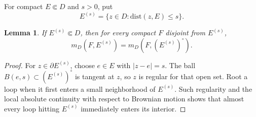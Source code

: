 \documentclass[11pt]{article}
\numberwithin{equation}{section}
\newcommand{\1}{\mathbf{1}}
\newcommand{\dist}{\mathrm{dist}}
\newtheorem{lemma}[theorem]{Lemma}
\begin{document}
For compact \(E\Subset D\) and \(s>0\), put
\[
 E^{(s)}=\{z\in D:\dist(z,E)\leq s\}.
\]
\begin{lemma}\label{lem:parallel-regular}
If \(E^{(s)}\Subset D\), then for every compact \(F\) disjoint from
\(E^{(s)}\),
\[
 m_D(F,E^{(s)})=m_D(F,(E^{(s)})^\circ).
\]
\end{lemma}
\begin{proof}
For \(z\in\partial E^{(s)}\), choose \(e\in E\) with \(|z-e|=s\).  The
ball \(B(e,s)\subset(E^{(s)})^\circ\) is tangent at \(z\), so \(z\) is
regular for that open set.  Root a loop when it first enters a
small neighborhood of \(E^{(s)}\). Such regularity and the local absolute continuity with respect to Brownian motion shows that almost every loop hitting \(E^{(s)}\) immediately enters its interior.
\end{proof}
\end{document}
